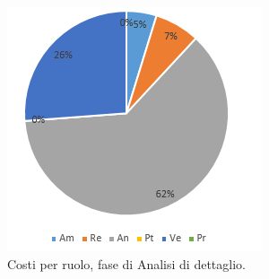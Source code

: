 \documentclass[a4paper]{article}
\begin{document}
			\begin{figure}[H]
				\centering
				\includegraphics[scale=0.7]{pc_costi_dettaglio}
				\caption{Costi per ruolo, fase di Analisi di dettaglio.}
			\end{figure}
			
\end{document}
